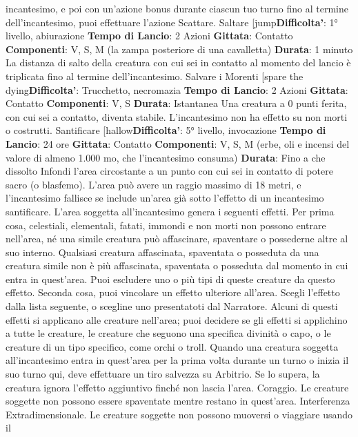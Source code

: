 \begin{multicols}{2}
incantesimo, e poi con un’azione bonus durante
ciascun tuo turno fino al termine dell’incantesimo, puoi
effettuare l’azione Scattare.
Saltare
[jump\textbf{Difficolta'}:
1° livello, abiurazione
\textbf{Tempo di Lancio}: 2 Azioni
\textbf{Gittata}: Contatto
\textbf{Componenti}: V, S, M (la zampa posteriore di una
cavalletta)
\textbf{Durata}: 1 minuto
La distanza di salto della creatura con cui sei in contatto
al momento del lancio è triplicata fino al termine
dell’incantesimo.
Salvare i Morenti
[spare the dying\textbf{Difficolta'}:
Trucchetto, necromazia
\textbf{Tempo di Lancio}: 2 Azioni
\textbf{Gittata}: Contatto
\textbf{Componenti}: V, S
\textbf{Durata}: Istantanea
Una creatura a 0 punti ferita, con cui sei a contatto,
diventa stabile. L’incantesimo non ha effetto su non
morti o costrutti.
Santificare
[hallow\textbf{Difficolta'}:
5° livello, invocazione
\textbf{Tempo di Lancio}: 24 ore
\textbf{Gittata}: Contatto
\textbf{Componenti}: V, S, M (erbe, oli e incensi del valore di
almeno 1.000 mo, che l’incantesimo consuma)
\textbf{Durata}: Fino a che dissolto
Infondi l’area circostante a un punto con cui sei in
contatto di potere sacro (o blasfemo). L’area può avere
un raggio massimo di 18 metri, e l’incantesimo fallisce
se include un’area già sotto l’effetto di un incantesimo
santificare. L’area soggetta all’incantesimo genera i
seguenti effetti.
Per prima cosa, celestiali, elementali, fatati, immondi e
non morti non possono entrare nell’area, né una simile
creatura può affascinare, spaventare o possederne
altre al suo interno. Qualsiasi creatura affascinata,
spaventata o posseduta da una creatura simile non è
più affascinata, spaventata o posseduta dal momento in
cui entra in quest’area. Puoi escludere uno o più tipi di
queste creature da questo effetto.
Seconda cosa, puoi vincolare un effetto ulteriore
all’area. Scegli l’effetto dalla lista seguente, o scegline
uno presentatoti dal Narratore. Alcuni di questi effetti si
applicano alle creature nell’area; puoi decidere se gli
effetti si applichino a tutte le creature, le creature che
seguono una specifica divinità o capo, o le creature di
un tipo specifico, come orchi o troll. Quando una
creatura soggetta all’incantesimo entra in quest’area
per la prima volta durante un turno o inizia il suo turno
qui, deve effettuare un tiro salvezza su Arbitrio. Se lo
supera, la creatura ignora l’effetto aggiuntivo finché non
lascia l’area.
Coraggio. Le creature soggette non possono essere
spaventate mentre restano in quest’area.
Interferenza Extradimensionale. Le creature soggette
non possono muoversi o viaggiare usando il

\end{multicols}
